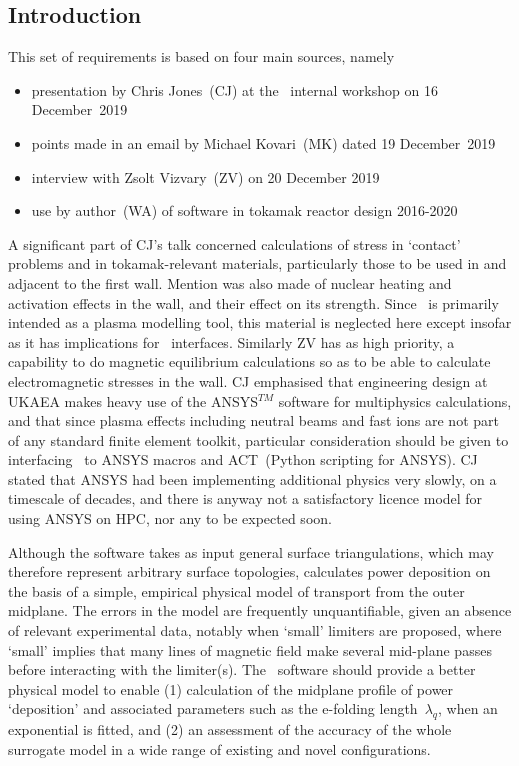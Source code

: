 \subsection{Introduction}\label{sec:RB2_intro}
This set of requirements is based on four main sources, namely
\begin{itemize}
\item presentation by Chris Jones~(CJ) at the \nep\ internal workshop on 16 December~2019
\item points made in an email by Michael Kovari~(MK) dated 19 December~2019
\item interview with Zsolt Vizvary~(ZV) on 20 December 2019
\item use by author~(WA) of  software in tokamak reactor design 2016-2020
\end{itemize}

A significant part of CJ's talk concerned calculations of stress in `contact' problems and in
tokamak-relevant materials, particularly those to be used in and adjacent to the
first wall. Mention was also made of nuclear heating and activation effects in the wall, and
their effect on its strength. Since \nep \ is primarily intended as a plasma modelling tool, this
material is neglected here except insofar as it has implications for \nep \ interfaces.
Similarly ZV has as high priority, a capability to do magnetic equilibrium calculations so
as to be able to calculate electromagnetic stresses in the wall.
CJ emphasised that engineering design at UKAEA makes heavy use of the ANSYS$^{TM}$
software for multiphysics calculations, and that since plasma effects including neutral beams
and fast ions are not part of any standard finite element toolkit, particular consideration should 
be given to interfacing \nep \ to ANSYS macros and ACT~(Python scripting for ANSYS).
CJ stated that ANSYS had been implementing additional physics very slowly, on a timescale of decades,
and there is anyway not a satisfactory licence model for using ANSYS on HPC,
nor any to be expected soon.

Although the  software takes as input general surface triangulations, which may therefore
represent arbitrary surface topologies,  calculates power deposition on the basis
of a simple, empirical physical model of transport from the outer midplane.
The errors in the model are frequently unquantifiable, given an absence of relevant experimental data,
notably when `small' limiters are proposed, where `small' implies that many lines of magnetic field make several
mid-plane passes before interacting with the limiter(s). The \nep \ software should provide a better
physical model to enable (1) calculation of the midplane profile of power `deposition' and associated
parameters such as the e-folding length~$\lambda_q$, when an exponential is fitted, and
(2) an assessment of the accuracy of the whole  surrogate model in a wide range of
existing and novel configurations.
 

